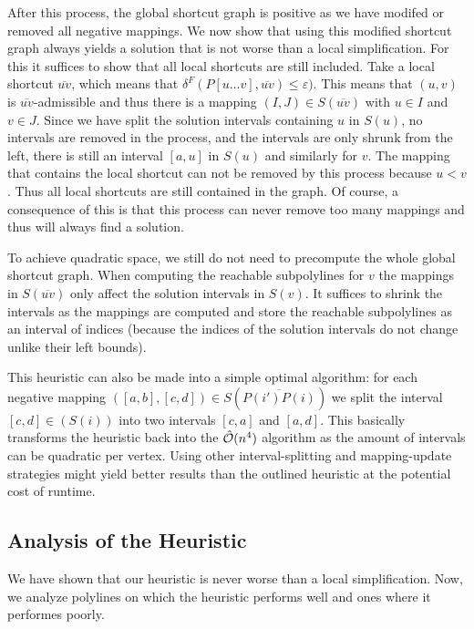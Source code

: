 After this process, the global shortcut graph is positive as we have modifed or removed all negative mappings. We now show that using this modified shortcut graph always yields a solution that is not worse than a local simplification. For this it suffices to show that all local shortcuts are still included. Take a local shortcut \(\overline{uv}\), which means that \(\delta^F(P[u \dots v], \overline{uv}) \leq \varepsilon)\). This means that \((u, v)\) is \(\overline{uv}\)-admissible and thus there is a mapping \((I, J) \in S(\overline{uv})\) with \(u \in I\) and \(v \in J\). Since we have split the solution intervals containing \(u\) in \(S(u)\), no intervals are removed in the process, and the intervals are only shrunk from the left, there is still an interval \([a, u]\) in \(S(u)\) and similarly for \(v\). The mapping that contains the local shortcut can not be removed by this process because \(u < v\). Thus all local shortcuts are still contained in the graph. Of course, a consequence of this is that this process can never remove too many mappings and thus will always find a solution.

To achieve quadratic space, we still do not need to precompute the whole global shortcut graph. When computing the reachable subpolylines for \(v\) the mappings in \(S(\overline{uv})\) only affect the solution intervals in \(S(v)\). It suffices to shrink the intervals as the mappings are computed and store the reachable subpolylines as an interval of indices (because the indices of the solution intervals do not change unlike their left bounds).

This heuristic can also be made into a simple optimal algorithm: for each negative mapping \(([a,b], [c,d]) \in S(\overline{P(i')P(i)})\) we split the interval \([c, d] \in (S(i))\) into two intervals \([c, a]\) and \([a, d]\). This basically transforms the heuristic back into the \(\hat{\mathcal{O}}(n^4)\) algorithm as the amount of intervals can be quadratic per vertex. Using other interval-splitting and mapping-update strategies might yield better results than the outlined heuristic at the potential cost of runtime.

\subsection{Analysis of the Heuristic}
We have shown that our heuristic is never worse than a local simplification. Now, we analyze polylines on which the heuristic performs well and ones where it performes poorly.

